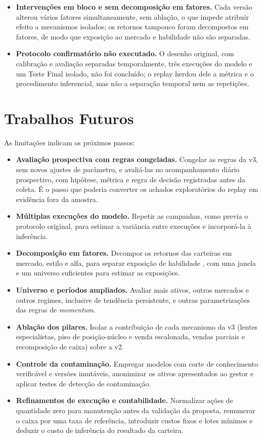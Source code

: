 \begin{itemize}
    \item \textbf{Intervenções em bloco e sem decomposição em fatores.} Cada versão alterou vários fatores simultaneamente, sem ablação, o que impede atribuir efeito a mecanismos isolados; os retornos tampouco foram decompostos em fatores, de modo que exposição ao mercado e habilidade não são separadas.
    \item \textbf{Protocolo confirmatório não executado.} O desenho original, com calibração e avaliação separadas temporalmente, três execuções do modelo e um Teste Final isolado, não foi concluído; o replay herdou dele a métrica e o procedimento inferencial, mas não a separação temporal nem as repetições.
\end{itemize}

\section{Trabalhos Futuros}

As limitações indicam os próximos passos:

\begin{itemize}
    \item \textbf{Avaliação prospectiva com regras congeladas.} Congelar as regras da v3, sem novos ajustes de parâmetro, e avaliá-las no acompanhamento diário prospectivo, com hipótese, métrica e regra de decisão registradas antes da coleta. É o passo que poderia converter os achados exploratórios do replay em evidência fora da amostra.
    \item \textbf{Múltiplas execuções do modelo.} Repetir as campanhas, como previa o protocolo original, para estimar a variância entre execuções e incorporá-la à inferência.
    \item \textbf{Decomposição em fatores.} Decompor os retornos das carteiras em mercado, estilo e alfa, para separar exposição de habilidade \citep{FamaFrench1993, Wang2026beta}, com uma janela e um universo suficientes para estimar as exposições.
    \item \textbf{Universo e períodos ampliados.} Avaliar mais ativos, outros mercados e outros regimes, inclusive de tendência persistente, e outras parametrizações das regras de \textit{momentum}.
    \item \textbf{Ablação dos pilares.} Isolar a contribuição de cada mecanismo da v3 (lentes especialistas, piso de posição-núcleo e venda escalonada, vendas parciais e recomposição de caixa) sobre a v2.
    \item \textbf{Controle da contaminação.} Empregar modelos com corte de conhecimento verificável e versões imutáveis, anonimizar os ativos apresentados ao gestor e aplicar testes de detecção de contaminação.
    \item \textbf{Refinamentos de execução e contabilidade.} Normalizar ações de quantidade zero para manutenção antes da validação da proposta, remunerar o caixa por uma taxa de referência, introduzir custos fixos e lotes mínimos e deduzir o custo de inferência do resultado da carteira.
\end{itemize}

